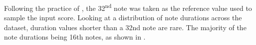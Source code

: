 
Following the practice of \textcite{micchi2020not}, the
32\textsuperscript{nd} note was taken as the reference value
used to sample the input score. Looking at a distribution of
note durations across the dataset, duration values shorter
than a 32nd note are rare. The majority of the note
durations being 16th notes, as shown in
.

